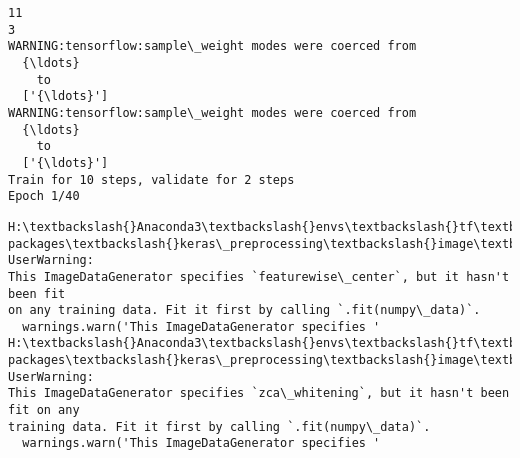 \documentclass[11pt]{article}
\begin{document}
    \begin{Verbatim}[commandchars=\\\{\}]
11
3
WARNING:tensorflow:sample\_weight modes were coerced from
  {\ldots}
    to
  ['{\ldots}']
WARNING:tensorflow:sample\_weight modes were coerced from
  {\ldots}
    to
  ['{\ldots}']
Train for 10 steps, validate for 2 steps
Epoch 1/40
    \end{Verbatim}

    \begin{Verbatim}[commandchars=\\\{\}]
H:\textbackslash{}Anaconda3\textbackslash{}envs\textbackslash{}tf\textbackslash{}lib\textbackslash{}site-
packages\textbackslash{}keras\_preprocessing\textbackslash{}image\textbackslash{}image\_data\_generator.py:716: UserWarning:
This ImageDataGenerator specifies `featurewise\_center`, but it hasn't been fit
on any training data. Fit it first by calling `.fit(numpy\_data)`.
  warnings.warn('This ImageDataGenerator specifies '
H:\textbackslash{}Anaconda3\textbackslash{}envs\textbackslash{}tf\textbackslash{}lib\textbackslash{}site-
packages\textbackslash{}keras\_preprocessing\textbackslash{}image\textbackslash{}image\_data\_generator.py:735: UserWarning:
This ImageDataGenerator specifies `zca\_whitening`, but it hasn't been fit on any
training data. Fit it first by calling `.fit(numpy\_data)`.
  warnings.warn('This ImageDataGenerator specifies '
    \end{Verbatim}
\end{document}
